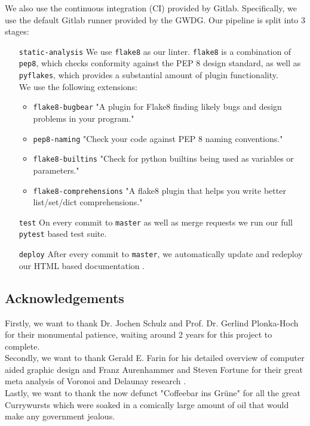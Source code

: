 We also use the continuous integration (CI) provided by Gitlab. Specifically, we use the default Gitlab runner provided by the GWDG. Our pipeline is split into 3 stages:
\begin{itemize}
    \item[\texttt{static-analysis}] We use \texttt{flake8} as our linter. \texttt{flake8} is a combination of \texttt{pep8}, which checks conformity against the PEP 8 design standard, as well as \texttt{pyflakes}, which provides a substantial amount of plugin functionality.\\
    We use the following extensions:
    \begin{itemize}
        \item \texttt{flake8-bugbear} "A plugin for Flake8 finding likely bugs and design problems in your program."
        \item \texttt{pep8-naming} "Check your code against PEP 8 naming conventions."
        \item \texttt{flake8-builtins} "Check for python builtins being used as variables or parameters."
        \item \texttt{flake8-comprehensions} "A flake8 plugin that helps you write better list/set/dict comprehensions."
    \end{itemize}
    \item[\texttt{test}] On every commit to \texttt{master} as well as merge requests we run our full \texttt{pytest} based test suite.
    \item[\texttt{deploy}] After every commit to \texttt{master}, we automatically update and redeploy our HTML based documentation \cite{CPY}.
\end{itemize}
\subsection{Acknowledgements}
Firstly, we want to thank Dr. Jochen Schulz and Prof. Dr. Gerlind Plonka-Hoch for their monumental patience, waiting around 2 years for this project to complete.\\
Secondly, we want to thank Gerald E. Farin for his detailed overview of computer aided graphic design \cite{10.5555/501891} and Franz Aurenhammer and Steven Fortune for their great meta analysis of Voronoi and Delaunay research \cite{Aurenhammer1991} \cite{FORTUNE1995}.\\
Lastly, we want to thank the now defunct "Coffeebar ins Grüne" for all the great Currywursts which were soaked in a comically large amount of oil that would make any government jealous.